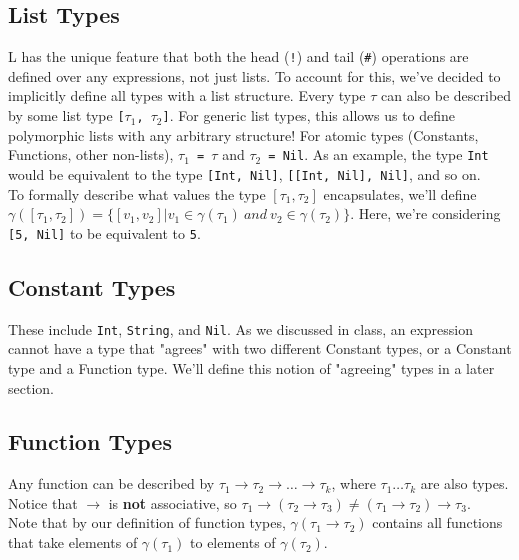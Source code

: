 \documentclass[12pt]{article}
\begin{document}
\subsection{List Types}
L has the unique feature that both the head (\texttt{!}) and tail (\texttt{\#}) operations are defined over any expressions, not just lists. To account for this, we've decided to implicitly define all types with a list structure. Every type \texttt{$\tau$} can also be described by some list type \texttt{[$\tau_1$, $\tau_2$]}. For generic list types, this allows us to define polymorphic lists with any arbitrary structure! For atomic types (Constants, Functions, other non-lists), \texttt{$\tau_1$ = $\tau$} and \texttt{$\tau_2$ = Nil}. As an example, the type \texttt{Int} would be equivalent to the type \texttt{[Int, Nil]}, \texttt{[[Int, Nil], Nil]}, and so on.\\
To formally describe what values the type $[\tau_1, \tau_2]$ encapsulates, we'll define $\gamma([\tau_1, \tau_2]) = \{[v_1, v_2] | v_1\in\gamma(\tau_1)\ and\ v_2\in\gamma(\tau_2)\}$. Here, we're considering \texttt{[5, Nil]} to be equivalent to \texttt{5}.

\subsection{Constant Types}
These include \texttt{Int}, \texttt{String}, and \texttt{Nil}. As we discussed in class, an expression cannot have a type that "agrees" with two different Constant types, or a Constant type and a Function type. We'll define this notion of "agreeing" types in a later section.

\subsection{Function Types}
Any function can be described by $\tau_1\rightarrow\tau_2\rightarrow\ldots\rightarrow\tau_k$, where $\tau_1\ldots\tau_k$ are also types. Notice that $\rightarrow$ is \textbf{not} associative, so $\tau_1\rightarrow(\tau_2\rightarrow\tau_3) \neq (\tau_1\rightarrow\tau_2)\rightarrow\tau_3$.\\
Note that by our definition of function types, $\gamma(\tau_1\rightarrow\tau_2)$ contains all functions that take elements of $\gamma(\tau_1)$ to elements of $\gamma(\tau_2)$.
\end{document}
